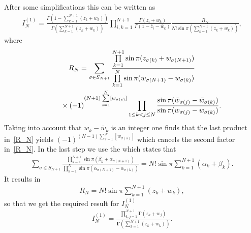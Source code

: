 After some simplifications this can be written as
\begin{gather*}
I_N^{(1)}=\frac{\Gamma\left(1-\sum\limits_{k=1}^{N+1}(\bar z_k+\bar w_k)\right)}{\Gamma\left(\sum\limits_{k=1}^{N+1}( z_k+ w_k)\right)}
\prod_{i,k=1}^{N+1}\frac{\Gamma(z_i+w_k)}{\Gamma(1-\bar z_i-\bar w_k)}
\frac{ R_N}{N!\sin\pi\left(\sum\limits_{k=1}^{N+1}( z_k+ w_k)\right)},
\end{gather*}
where
\begin{gather}
R_N = \sum_{\sigma\in S_{N+1}}
\frac{\prod\limits_{k=1}^{N+1}
\sin\pi(z_{\sigma(k)}+w_{\sigma(N+1)})}
{\prod\limits_{k=1}^N\sin\pi(w_{\sigma(N+1)}-w_{\sigma(k)})}
\nonumber\\
\hphantom{R_N =}{} \times(-1)^{(N+1)\sum\limits_{s=1}^N[w_{\sigma(s)}]}\prod_{1\leq k<j\leq N}
\frac{\sin\pi(\bar w_{\sigma(j)}-\bar w_{\sigma(k)})}{\sin\pi( w_{\sigma(j)}- w_{\sigma(k)})} .\label{R_N}
\end{gather}
Taking into account that $w_k-\bar w_k$ is an integer one finds that the last product in~\eqref{R_N} yields $(-1)^{(N-1)\sum\limits_{s=1}^N [w_{\sigma(s)}]}$ which cancels the second factor in~\eqref{R_N}. In the last step we use the \cite[Lemma~5.10]{Gustafson94} which states that
\begin{gather*}
\sum_{\sigma\in S_{N+1}}
\frac{\prod\limits_{k=1}^{N+1}
\sin\pi(\beta_{k}+\alpha_{\sigma(N+1)})}
{\prod\limits_{k=1}^N\sin\pi(\alpha_{\sigma(N+1)}-\alpha_{\sigma(k)})} =
N!\sin\pi \sum_{k=1}^{N+1}(\alpha_k+\beta_k).
\end{gather*}
It results in
\begin{gather*}
R_N=N!\sin\pi \sum_{k=1}^{N+1}( z_k+ w_k),
\end{gather*}
so that we get the required result for $I_N^{(1)}$
 \begin{gather*}
I_N^{(1)}=\frac{\prod\limits_{k,j=1}^{N+1}\boldsymbol{\Gamma}(z_k+ w_j)}{
\boldsymbol{\Gamma}\left(\sum\limits_{k=1}^{N+1} (z_k+w_k) \right)} .
\end{gather*}
